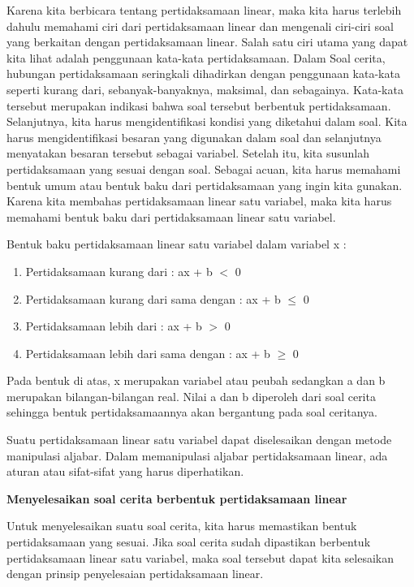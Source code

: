 \documentclass[11pt,fleqn]{book} %
\begin{document}
 Karena kita berbicara tentang pertidaksamaan linear, maka kita harus terlebih dahulu memahami ciri dari pertidaksamaan linear dan mengenali ciri-ciri soal yang berkaitan dengan pertidaksamaan linear. Salah satu ciri utama yang dapat kita lihat adalah penggunaan kata-kata pertidaksamaan. Dalam Soal cerita, hubungan pertidaksamaan seringkali dihadirkan dengan penggunaan kata-kata seperti kurang dari, sebanyak-banyaknya, maksimal, dan sebagainya. Kata-kata tersebut merupakan indikasi bahwa soal tersebut berbentuk pertidaksamaan. Selanjutnya, kita harus mengidentifikasi kondisi yang diketahui dalam soal. Kita harus mengidentifikasi besaran yang digunakan dalam soal dan selanjutnya menyatakan besaran tersebut sebagai variabel. Setelah itu, kita susunlah pertidaksamaan yang sesuai dengan soal. Sebagai acuan, kita harus memahami bentuk umum atau bentuk baku dari pertidaksamaan yang ingin kita gunakan. Karena kita membahas pertidaksamaan linear satu variabel, maka kita harus memahami bentuk baku dari pertidaksamaan linear satu variabel. 

\noindent Bentuk baku pertidaksamaan linear satu variabel dalam variabel x :

\begin{enumerate}
\item  Pertidaksamaan kurang dari : ax + b $<$ 0 

\item  Pertidaksamaan kurang dari sama dengan : ax + b $\mathrm{\le}$ 0

\item  Pertidaksamaan lebih dari : ax + b $>$ 0 

\item  Pertidaksamaan lebih dari sama dengan : ax + b $\ge $ 0
\end{enumerate}

\noindent Pada bentuk di atas, x merupakan variabel atau peubah sedangkan a dan b merupakan bilangan-bilangan real. Nilai a dan b diperoleh dari soal cerita sehingga bentuk pertidaksamaannya akan bergantung pada soal ceritanya.

\noindent Suatu pertidaksamaan linear satu variabel dapat diselesaikan dengan metode manipulasi aljabar. Dalam memanipulasi aljabar pertidaksamaan linear, ada aturan atau sifat-sifat yang harus diperhatikan. 

\noindent \textbf{Menyelesaikan soal cerita berbentuk pertidaksamaan linear}

\noindent Untuk menyelesaikan suatu soal cerita, kita harus memastikan bentuk pertidaksamaan yang sesuai. Jika soal cerita sudah dipastikan berbentuk pertidaksamaan linear satu variabel, maka soal tersebut dapat kita selesaikan dengan prinsip penyelesaian pertidaksamaan linear.
\end{document}
